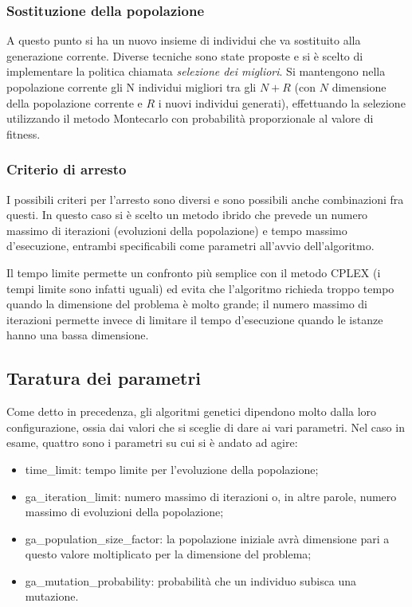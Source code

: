 \subsubsection{Sostituzione della popolazione}\label{subsubsec:sostituzione-popolazione}
A questo punto si ha un nuovo insieme di individui che va sostituito alla generazione corrente.
Diverse tecniche sono state proposte e si è scelto di implementare la politica chiamata \textit{selezione dei migliori}.
Si mantengono nella popolazione corrente gli N individui migliori tra gli $N + R$ (con $N$ dimensione della popolazione corrente
e $R$ i nuovi individui generati), effettuando la selezione utilizzando il metodo Montecarlo con probabilità
proporzionale al valore di fitness.
\subsubsection{Criterio di arresto}\label{subsubsec:criterio-arresto}
I possibili criteri per l'arresto sono diversi e sono possibili anche combinazioni fra questi.
In questo caso si è scelto un metodo ibrido che prevede un numero massimo di iterazioni (evoluzioni
della popolazione) e tempo massimo d'esecuzione, entrambi specificabili come parametri all'avvio dell'algoritmo.

Il tempo limite permette un confronto più semplice con il metodo CPLEX (i tempi limite sono infatti uguali)
ed evita che l'algoritmo richieda troppo tempo quando la dimensione del problema è molto grande;
il numero massimo di iterazioni permette invece di limitare il tempo d'esecuzione
quando le istanze hanno una bassa dimensione.
\subsection{Taratura dei parametri}\label{subsec:parametri}
Come detto in precedenza, gli algoritmi genetici dipendono molto dalla loro configurazione, ossia
dai valori che si sceglie di dare ai vari parametri.
Nel caso in esame, quattro sono i parametri su cui si è andato ad agire:
\begin{itemize}
	\item \textsf{time\_limit}: tempo limite per l'evoluzione della popolazione;
	\item \textsf{ga\_iteration\_limit}: numero massimo di iterazioni o, in altre parole, numero massimo di evoluzioni
	della popolazione;
	\item \textsf{ga\_population\_size\_factor}: la popolazione iniziale avrà dimensione pari a questo valore
	moltiplicato per la dimensione del problema;
	\item \textsf{ga\_mutation\_probability}: probabilità che un individuo subisca una mutazione.
\end{itemize}
%
